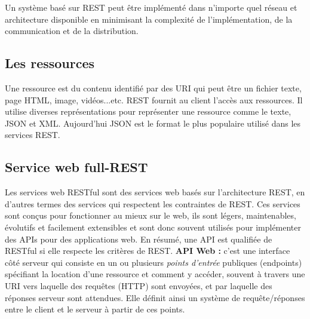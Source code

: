 Un système basé sur REST peut être implémenté dans n'importe quel réseau et architecture disponible en minimisant la complexité de l'implémentation, de la communication et de la distribution.\cite{richardson2008restful}

\subsection{Les ressources}
Une ressource est du contenu identifié par des URI  qui peut être un fichier texte, page HTML, image, vidéos...etc.
REST fournit au client l'accès aux ressources. Il utilise diverses représentations pour représenter une ressource comme le texte, JSON et XML. Aujourd'hui JSON est le format le plus populaire utilisé dans les services REST.

\subsection{Service web full-REST}
Les services web RESTful sont des services web basés sur l'architecture REST, en d'autres termes des services qui respectent les contraintes de REST.
Ces services sont conçus pour fonctionner au mieux sur le web, ils sont légers, maintenables, évolutifs et facilement extensibles et sont donc souvent utilisés pour implémenter des APIs pour des applications web.\cite{refTutorialPointsREST}
\newline 
En résumé, une API est qualifiée de RESTful si elle respecte les critères de REST.
\newline
\newline
\textbf{API Web :} c'est une interface côté serveur qui consiste en un ou plusieurs \emph{points d'entrée} publiques (endpoints) spécifiant la location d'une ressource et comment y accéder, souvent à travers une URI vers laquelle des requêtes (HTTP) sont envoyées, et par laquelle des réponses serveur sont attendues.
Elle définit ainsi un système de requête/réponses entre le client et le serveur à partir de ces points.

\newpage
